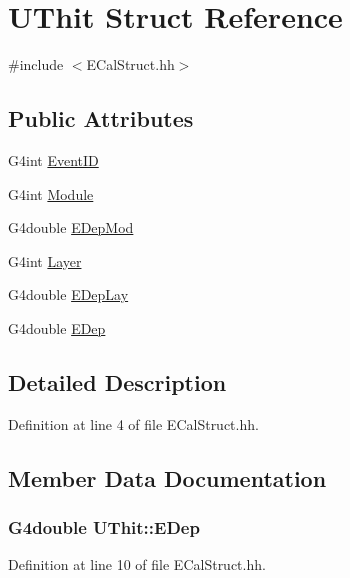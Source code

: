 \hypertarget{struct_u_thit}{\section{U\-Thit Struct Reference}
\label{struct_u_thit}
}


{\ttfamily \#include $<$E\-Cal\-Struct.\-hh$>$}

\subsection*{Public Attributes}
\begin{DoxyCompactItemize}
\item 
G4int \hyperlink{struct_u_thit_a501961d563d8d0d27131c2ea0aef89b3}{Event\-I\-D}
\item 
G4int \hyperlink{struct_u_thit_a3e27114c436828b83cab57a70ee88ccf}{Module}
\item 
G4double \hyperlink{struct_u_thit_a385c0de02872d9873961439a6b7c0c50}{E\-Dep\-Mod}
\item 
G4int \hyperlink{struct_u_thit_a01c340c7ba48d78aaf6ef49bc88c0f6e}{Layer}
\item 
G4double \hyperlink{struct_u_thit_a48d071a926fa1521ee2cebcbc43bc1d0}{E\-Dep\-Lay}
\item 
G4double \hyperlink{struct_u_thit_a8679c3f57177fb9e460c826ffaa9a34b}{E\-Dep}
\end{DoxyCompactItemize}


\subsection{Detailed Description}


Definition at line 4 of file E\-Cal\-Struct.\-hh.



\subsection{Member Data Documentation}
\hypertarget{struct_u_thit_a8679c3f57177fb9e460c826ffaa9a34b}{
\subsubsection[{E\-Dep}]{\setlength{\rightskip}{0pt plus 5cm}G4double U\-Thit\-::\-E\-Dep}}\label{struct_u_thit_a8679c3f57177fb9e460c826ffaa9a34b}


Definition at line 10 of file E\-Cal\-Struct.\-hh.

